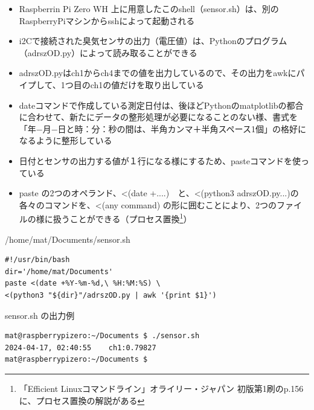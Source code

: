 \documentclass[12pt,a4paper,uplatex]{jsarticle}
\begin{document}
\begin{itemize}
	\item Raspberrin Pi Zero WH 上に用意したこのshell（sensor.sh）は、別のRaspberryPiマシンからsshによって起動される
	\item i2Cで接続された臭気センサの出力（電圧値）は、Pythonのプログラム（adrszOD.py）によって読み取ることができる
	\item adrszOD.pyはch1からch4までの値を出力しているので、その出力をawkにパイプして、1つ目のch1の値だけを取り出している
	\item dateコマンドで作成している測定日付は、後ほどPythonのmatplotlibの都合に合わせて、新たにデータの整形処理が必要になることのない様、書式を「年−月−日と時：分：秒の間は、半角カンマ＋半角スペース1個」の格好になるように整形している
	\item 日付とセンサの出力する値が１行になる様にするため、pasteコマンドを使っている
	\item paste の2つのオペランド、<(date +....)　と、<(python3 adrszOD.py...)の各々のコマンドを、<(any command) の形に囲むことにより、2つのファイルの様に扱うことができる（プロセス置換\footnote{「Efficient Linuxコマンドライン」オライリー・ジャパン 初版第1刷のp.156に、プロセス置換の解説がある}）
\end{itemize}

\begin{itembox}[l]{/home/mat/Documents/sensor.sh}
	\begin{verbatim}
#!/usr/bin/bash
dir='/home/mat/Documents'
paste <(date +%Y-%m-%d,\ %H:%M:%S) \
<(python3 "${dir}"/adrszOD.py | awk '{print $1}')
	\end{verbatim}
\end{itembox}

\begin{itembox}[l]{sensor.sh の出力例}
	\begin{verbatim}
mat@raspberrypizero:~/Documents $ ./sensor.sh 
2024-04-17, 02:40:55	ch1:0.79827
mat@raspberrypizero:~/Documents $ 
	\end{verbatim}
\end{itembox}
\end{document}
